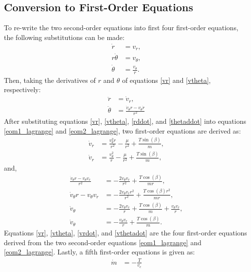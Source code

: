 \documentclass[]{article}
\begin{document}
\subsection{Conversion to First-Order Equations}
To re-write the two second-order equations into first four first-order equations, the following substitutions can be made:
\begin{align}
	\dot{r}       &= v_r,     \label{vr} \\
	r\dot{\theta} &= v_\theta,  \nonumber \\
	\dot{\theta}  &= \frac{v_\theta}{r}. \label{vtheta}
\end{align}
Then, taking the derivatives of \(r\) and \(\theta\) of equations \ref{vr} and \ref{vtheta}, respectively:
\begin{align}
	\ddot{r}      &= \dot{v}_r,  \label{rddot} \\
	\ddot{\theta} &= \frac{\dot{v}_{\theta}r - v_{\theta}\dot{r}}{r^2} \label{thetaddot}
\end{align}
After substituting equations \ref{vr}, \ref{vtheta}, \ref{rddot}, and \ref{thetaddot} into equations \ref{eom1_lagrange} and \ref{eom2_lagrange}, two first-order equations are derived as:
\begin{align}
    \dot{v}_r     &= \frac{v^2_{\theta}r}{r^2} - \frac{\mu}{r^2} + \frac{T\sin(\beta)}{m},                      \nonumber \\
    \dot{v}_r     &= \frac{v^2_{\theta}}{r} - \frac{\mu}{r^2} + \frac{T\sin(\beta)}{m},                        \label{vrdot}
\end{align}
and,
\begin{align}
	\frac{\dot{v}_{\theta}r - v_{\theta}v_r}{r^2} &= -\frac{2v_{\theta}v_r}{r^2}   + \frac{T\cos(\beta)}{mr},   \nonumber\\
	\dot{v}_{\theta}r - v_{\theta}v_r &= -\frac{2v_{\theta}v_{r}r^2}{r^2}   + \frac{T\cos(\beta)r^2}{mr},       \nonumber\\
	\dot{v}_\theta &= -\frac{2v_{\theta}v_{r}}{r}   + \frac{T\cos(\beta)}{m} + \frac{v_{\theta}v_r}{r},        \nonumber\\
	\dot{v}_\theta &= -\frac{v_{\theta}v_{r}}{r}   + \frac{T\cos(\beta)}{m} \label{vthetadot}.
\end{align}
Equations \ref{vr}, \ref{vtheta}, \ref{vrdot}, and \ref{vthetadot} are the four first-order equations derived from the two second-order equations \ref{eom1_lagrange} and \ref{eom2_lagrange}. Lastly, a fifth first-order equations is given as:
\begin{align}
	\dot{m} &= -\frac{T}{v_e} \label{massflowrate}
\end{align}
\end{document}
